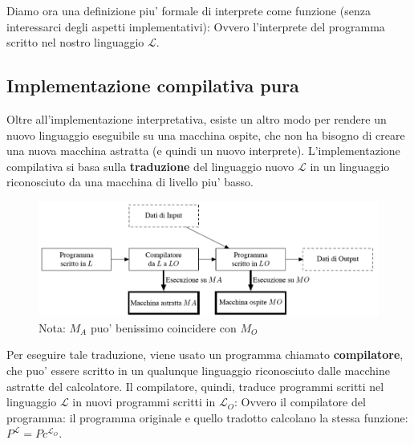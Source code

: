 Diamo ora una definizione piu' formale di interprete come funzione (senza interessarci degli aspetti implementativi):
Ovvero l'interprete  del programma scritto nel nostro linguaggio $ \mathcal{L} $.

\subsection{Implementazione compilativa pura}
Oltre all'implementazione interpretativa, esiste un altro modo per rendere un nuovo linguaggio eseguibile su una macchina ospite, che non ha bisogno di creare una nuova macchina astratta (e quindi un nuovo interprete). L'implementazione compilativa si basa sulla \textbf{traduzione} del linguaggio nuovo $ \mathcal{L} $ in un linguaggio riconosciuto da una macchina di livello piu' basso.

\begin{figure}
  \includegraphics[scale=0.5]{img/2024-12-14-12-09-34.png}
  \caption{Nota: $ M_A $ puo' benissimo coincidere con $ M_O $}
\end{figure}

Per eseguire tale traduzione, viene usato un programma chiamato \textbf{compilatore}, che puo' essere scritto in un qualunque linguaggio riconosciuto dalle macchine astratte del calcolatore. Il compilatore, quindi, traduce programmi scritti nel linguaggio $ \mathcal{L} $ in nuovi programmi  scritti in $ \mathcal{L}_O $:
Ovvero il compilatore  del programma: il programma originale e quello tradotto calcolano la stessa funzione: $ P^\mathcal{L} = Pc^{\mathcal{L}_O} $.

